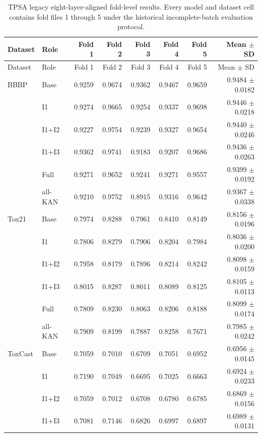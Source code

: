 \documentclass[journal=jcisd8,manuscript=article]{achemso}
\begin{document}
\begin{landscape}
\begin{longtable}{llrrrrrr}
\caption{TPSA legacy eight-layer-aligned fold-level results. Every model and dataset cell contains fold files 1 through 5 under the historical incomplete-batch evaluation protocol.}
\label{tab:si-tpsa-fold-results}\\
\toprule
Dataset & Role & Fold 1 & Fold 2 & Fold 3 & Fold 4 & Fold 5 & Mean $\pm$ SD \\
\midrule
\endfirsthead
\toprule
Dataset & Role & Fold 1 & Fold 2 & Fold 3 & Fold 4 & Fold 5 & Mean $\pm$ SD \\
\midrule
\endhead
BBBP & Base & 0.9259 & 0.9674 & 0.9362 & 0.9467 & 0.9659 & 0.9484 $\pm$ 0.0182 \\
 & I1 & 0.9274 & 0.9665 & 0.9254 & 0.9337 & 0.9698 & 0.9446 $\pm$ 0.0218 \\
 & I1+I2 & 0.9227 & 0.9754 & 0.9239 & 0.9327 & 0.9654 & 0.9440 $\pm$ 0.0246 \\
 & I1+I3 & 0.9362 & 0.9741 & 0.9183 & 0.9207 & 0.9686 & 0.9436 $\pm$ 0.0263 \\
 & Full & 0.9271 & 0.9652 & 0.9241 & 0.9271 & 0.9557 & 0.9399 $\pm$ 0.0192 \\
 & all-KAN & 0.9210 & 0.9752 & 0.8915 & 0.9316 & 0.9642 & 0.9367 $\pm$ 0.0338 \\
\midrule
Tox21 & Base & 0.7974 & 0.8288 & 0.7961 & 0.8410 & 0.8149 & 0.8156 $\pm$ 0.0196 \\
 & I1 & 0.7806 & 0.8279 & 0.7906 & 0.8204 & 0.7984 & 0.8036 $\pm$ 0.0200 \\
 & I1+I2 & 0.7958 & 0.8179 & 0.7896 & 0.8214 & 0.8242 & 0.8098 $\pm$ 0.0159 \\
 & I1+I3 & 0.8015 & 0.8287 & 0.8011 & 0.8089 & 0.8125 & 0.8105 $\pm$ 0.0113 \\
 & Full & 0.7809 & 0.8230 & 0.8063 & 0.8206 & 0.8188 & 0.8099 $\pm$ 0.0174 \\
 & all-KAN & 0.7909 & 0.8199 & 0.7887 & 0.8258 & 0.7671 & 0.7985 $\pm$ 0.0242 \\
\midrule
ToxCast & Base & 0.7059 & 0.7010 & 0.6709 & 0.7051 & 0.6952 & 0.6956 $\pm$ 0.0145 \\
 & I1 & 0.7190 & 0.7049 & 0.6695 & 0.7025 & 0.6663 & 0.6924 $\pm$ 0.0233 \\
 & I1+I2 & 0.7059 & 0.7012 & 0.6708 & 0.6780 & 0.6785 & 0.6869 $\pm$ 0.0156 \\
 & I1+I3 & 0.7081 & 0.7146 & 0.6826 & 0.6997 & 0.6897 & 0.6989 $\pm$ 0.0131 \\

\end{longtable}
\end{landscape}
\end{document}
